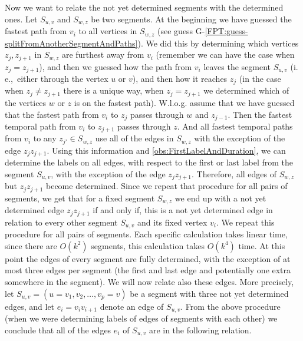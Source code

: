 \documentclass[11pt,a4paper]{article}
\theoremstyle{remark}
\theoremstyle{definition}
\newcommand{\ie}{i.\,e.,\ }
\begin{document}
Now we want to relate the not yet determined segments with the determined ones.
Let $S_{u,v}$ and $S_{w,z}$ be two segments.
At the beginning we have guessed the fastest path from $v_i$ to all vertices in $S_{w,z}$ (see guess G-\ref{FPT:guess-splitFromAnotherSegmentAndPaths}).
We did this by determining which vertices $z_j, z_{j+1}$ in $S_{w,z}$ are furthest away from $v_i$
(remember we can have the case when $z_j = z_{j+1}$),
and then we guessed how the path from $v_i$ leaves the segment $S_{u,v}$ (\ie either through the vertex $u$ or $v$),
and then how it reaches $z_j$ (in the case when $z_j \neq z_{j+1}$ there is a unique way,
when $z_j = z_{j+1}$ we determined which of the vertices $w$ or $z$ is on the fastest path).
W.l.o.g. assume that we have guessed that the fastest path from $v_i$ to $z_j$
passes through $w$ and $z_{j-1}$.
Then the fastest temporal path from $v_i$ to $z_{j+1}$ passes through $z$.
And all fastest temporal paths from $v_i$ to any $z_{j'} \in S_{w,z}$
use all of the edges in $S_{w,z}$ with the exception of the edge $z_j z_{j+1}$.
Using this information and \cref{obs:FirstLabelAndDuration}, we can determine the labels on all edges, with respect to the first or last label from the segment $S_{u,v}$,
with the exception of the edge $z_j z_{j+1}$.
Therefore, all edges of $S_{w,z}$ but $z_j z_{j+1}$ become determined.
Since we repeat that procedure for all pairs of segments,
we get that for a fixed segment $S_{w,z}$ we end up with a not yet determined edge $z_j z_{j+1}$
if and only if, this is a not yet determined edge in relation to every other segment $S_{u,v}$ and its fixed vertex $v_i$.
%
We repeat this procedure for all pairs of segments.
Each specific calculation takes linear time, since there are $O(k^2)$ segments, this calculation takes $O(k^4)$ time.
At this point
the edges of every segment are fully determined, 
with the exception of at most three edges per segment (the first and last edge and potentially one extra somewhere in the segment).
We will now relate also these edges.
More precisely,
let $S_{u,v} = (u=v_1, v_2, \dots, v_p=v)$ be a segment with three not yet determined edges,
and let $e_i =v_iv_{i+1}$ denote an edge of $S_{u,v}$.
From the above procedure (when we were determining labels of edges of segments with each other) 
we conclude that all of the edges $e_i$ of $S_{u,v}$ are in the following relation.
\end{document}
